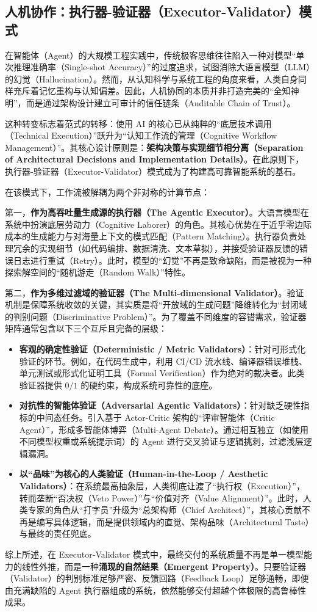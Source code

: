 \subsection{人机协作：执行器-验证器（Executor-Validator）模式}

在智能体（Agent）的大规模工程实践中，传统极客思维往往陷入一种对模型“单次推理准确率（Single-shot Accuracy）”的过度追求，试图消除大语言模型（LLM）的幻觉（Hallucination）。然而，从认知科学与系统工程的角度来看，人类自身同样充斥着记忆重构与认知偏差。因此，人机协同的本质并非打造完美的“全知神明”，而是通过架构设计建立可审计的信任链条（Auditable Chain of Trust）。

这种转变标志着范式的转移：使用 AI 的核心已从纯粹的“底层技术调用（Technical Execution）”跃升为“认知工作流的管理（Cognitive Workflow Management）”。其核心设计原则是：\textbf{架构决策与实现细节相分离（Separation of Architectural Decisions and Implementation Details）}。在此原则下，执行器-验证器（Executor-Validator）模式成为了构建高可靠智能系统的基石。

在该模式下，工作流被解耦为两个非对称的计算节点：

第一，\textbf{作为高吞吐量生成源的执行器（The Agentic Executor）}。大语言模型在系统中扮演底层劳动力（Cognitive Laborer）的角色。其核心优势在于近乎零边际成本的生成能力与对海量上下文的模式匹配（Pattern Matching）。执行器负责处理冗余的实现细节（如代码编排、数据清洗、文本草拟），并接受验证器反馈的错误日志进行重试（Retry）。此时，模型的“幻觉”不再是致命缺陷，而是被视为一种探索解空间的“随机游走（Random Walk）”特性。

第二，\textbf{作为多维过滤域的验证器（The Multi-dimensional Validator）}。验证机制是保障系统收敛的关键，其实质是将“开放域的生成问题”降维转化为“封闭域的判别问题（Discriminative Problem）”。为了覆盖不同维度的容错需求，验证器矩阵通常包含以下三个互斥且完备的层级：

\begin{itemize}
    \item \textbf{客观的确定性验证（Deterministic / Metric Validators）}：针对可形式化验证的环节。例如，在代码生成中，利用 CI/CD 流水线、编译器错误堆栈、单元测试或形式化证明工具（Formal Verification）作为绝对的裁决者。此类验证器提供 $0/1$ 的硬约束，构成系统可靠性的底座。
    \item \textbf{对抗性的智能体验证（Adversarial Agentic Validators）}：针对缺乏硬性指标的中间态任务。引入基于 Actor-Critic 架构的“评审智能体（Critic Agent）”，形成多智能体博弈（Multi-Agent Debate）。通过相互独立（如使用不同模型权重或系统提示词）的 Agent 进行交叉验证与逻辑挑刺，过滤浅层逻辑漏洞。
    \item \textbf{以“品味”为核心的人类验证（Human-in-the-Loop / Aesthetic Validators）}：在系统最高抽象层，人类彻底让渡了“执行权（Execution）”，转而垄断“否决权（Veto Power）”与“价值对齐（Value Alignment）”。此时，人类专家的角色从“打字员”升级为“总架构师（Chief Architect）”，其核心贡献不再是编写具体逻辑，而是提供领域内的直觉、架构品味（Architectural Taste）与最终的责任兜底。
\end{itemize}

综上所述，在 Executor-Validator 模式中，最终交付的系统质量不再是单一模型能力的线性外推，而是一种\textbf{涌现的自然结果（Emergent Property）}。只要验证器（Validator）的判别标准足够严密、反馈回路（Feedback Loop）足够通畅，即便由充满缺陷的 Agent 执行器组成的系统，依然能够交付超越个体极限的高鲁棒性成果。